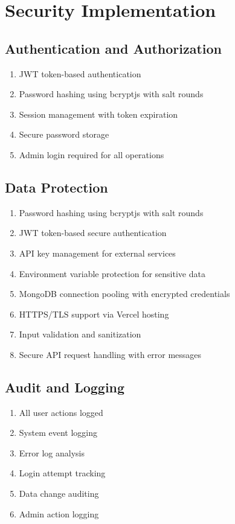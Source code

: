 \documentclass[12pt,a4paper]{report}
\begin{document}
\section{Security Implementation}

\subsection{Authentication and Authorization}

\begin{enumerate}[label=\roman*)]
    \item JWT token-based authentication
    \item Password hashing using bcryptjs with salt rounds
    \item Session management with token expiration
    \item Secure password storage
    \item Admin login required for all operations
\end{enumerate}

\subsection{Data Protection}

\begin{enumerate}[label=\roman*)]
    \item Password hashing using bcryptjs with salt rounds
    \item JWT token-based secure authentication
    \item API key management for external services
    \item Environment variable protection for sensitive data
    \item MongoDB connection pooling with encrypted credentials
    \item HTTPS/TLS support via Vercel hosting
    \item Input validation and sanitization
    \item Secure API request handling with error messages
\end{enumerate}

\subsection{Audit and Logging}

\begin{enumerate}[label=\roman*)]
    \item All user actions logged
    \item System event logging
    \item Error log analysis
    \item Login attempt tracking
    \item Data change auditing
    \item Admin action logging
\end{enumerate}
\end{document}
